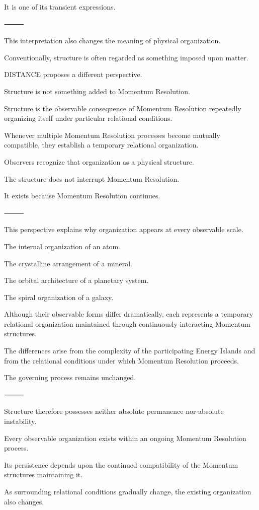 It is one of its transient expressions.

⸻

This interpretation also changes the meaning of physical organization.

Conventionally, structure is often regarded as something imposed upon matter.

DISTANCE proposes a different perspective.

Structure is not something added to Momentum Resolution.

Structure is the observable consequence of Momentum Resolution repeatedly organizing itself under particular relational conditions.

Whenever multiple Momentum Resolution processes become mutually compatible, they establish a temporary relational organization.

Observers recognize that organization as a physical structure.

The structure does not interrupt Momentum Resolution.

It exists because Momentum Resolution continues.

⸻

This perspective explains why organization appears at every observable scale.

The internal organization of an atom.

The crystalline arrangement of a mineral.

The orbital architecture of a planetary system.

The spiral organization of a galaxy.

Although their observable forms differ dramatically, each represents a temporary relational organization maintained through continuously interacting Momentum structures.

The differences arise from the complexity of the participating Energy Islands and from the relational conditions under which Momentum Resolution proceeds.

The governing process remains unchanged.

⸻

Structure therefore possesses neither absolute permanence nor absolute instability.

Every observable organization exists within an ongoing Momentum Resolution process.

Its persistence depends upon the continued compatibility of the Momentum structures maintaining it.

As surrounding relational conditions gradually change, the existing organization also changes.

